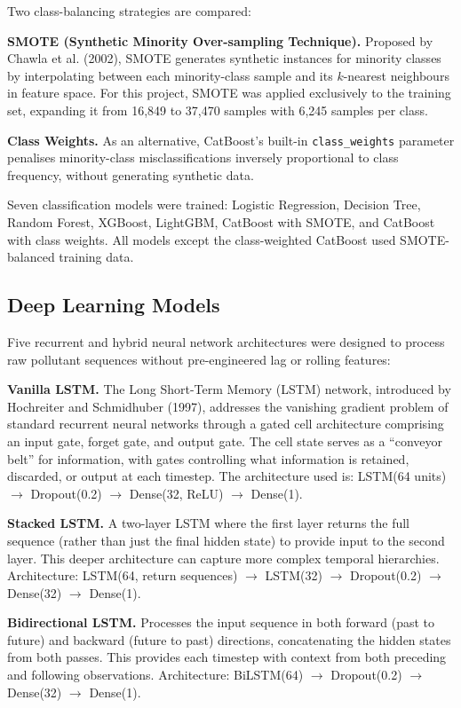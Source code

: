 \documentclass[12pt,a4paper]{report}
\begin{document}
Two class-balancing strategies are compared:

\textbf{SMOTE (Synthetic Minority Over-sampling Technique).} Proposed by Chawla et al. (2002), SMOTE generates synthetic instances for minority classes by interpolating between each minority-class sample and its $k$-nearest neighbours in feature space. For this project, SMOTE was applied exclusively to the training set, expanding it from 16,849 to 37,470 samples with 6,245 samples per class.

\textbf{Class Weights.} As an alternative, CatBoost's built-in \texttt{class\_weights} parameter penalises minority-class misclassifications inversely proportional to class frequency, without generating synthetic data.

Seven classification models were trained: Logistic Regression, Decision Tree, Random Forest, XGBoost, LightGBM, CatBoost with SMOTE, and CatBoost with class weights. All models except the class-weighted CatBoost used SMOTE-balanced training data.

\subsection{Deep Learning Models}

Five recurrent and hybrid neural network architectures were designed to process raw pollutant sequences without pre-engineered lag or rolling features:

\textbf{Vanilla LSTM.} The Long Short-Term Memory (LSTM) network, introduced by Hochreiter and Schmidhuber (1997), addresses the vanishing gradient problem of standard recurrent neural networks through a gated cell architecture comprising an input gate, forget gate, and output gate. The cell state serves as a ``conveyor belt'' for information, with gates controlling what information is retained, discarded, or output at each timestep. The architecture used is: LSTM(64 units) $\rightarrow$ Dropout(0.2) $\rightarrow$ Dense(32, ReLU) $\rightarrow$ Dense(1).

\textbf{Stacked LSTM.} A two-layer LSTM where the first layer returns the full sequence (rather than just the final hidden state) to provide input to the second layer. This deeper architecture can capture more complex temporal hierarchies. Architecture: LSTM(64, return sequences) $\rightarrow$ LSTM(32) $\rightarrow$ Dropout(0.2) $\rightarrow$ Dense(32) $\rightarrow$ Dense(1).

\textbf{Bidirectional LSTM.} Processes the input sequence in both forward (past to future) and backward (future to past) directions, concatenating the hidden states from both passes. This provides each timestep with context from both preceding and following observations. Architecture: BiLSTM(64) $\rightarrow$ Dropout(0.2) $\rightarrow$ Dense(32) $\rightarrow$ Dense(1).
\end{document}

